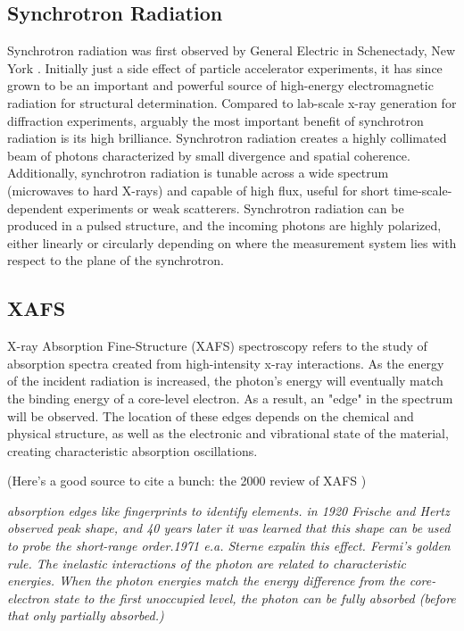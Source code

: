 \subsection{Synchrotron Radiation}

Synchrotron radiation was first observed by General Electric in Schenectady, New York \cite{firstSynchrotronRadPaper}. Initially just a side effect of particle accelerator experiments, it has since grown to be an important and powerful source of high-energy electromagnetic radiation for structural determination. Compared to lab-scale x-ray generation for diffraction experiments, arguably the most important benefit of synchrotron radiation is its high brilliance. Synchrotron radiation creates a highly collimated beam of photons characterized by small divergence and spatial coherence. Additionally, synchrotron radiation is tunable across a wide spectrum (microwaves to hard X-rays) and capable of high flux, useful for short time-scale-dependent experiments or weak scatterers. Synchrotron radiation can be produced in a pulsed structure, and the incoming photons are highly polarized, either linearly or circularly depending on where the measurement system lies with respect to the plane of the synchrotron. 

\subsection{XAFS}
X-ray Absorption Fine-Structure (XAFS) spectroscopy refers to the study of absorption spectra created from high-intensity x-ray interactions. As the energy of the incident radiation is increased, the photon's energy will eventually match the binding energy of a core-level electron. As a result, an "edge" in the spectrum will be observed. The location of these edges depends on the chemical and physical structure, as well as the electronic and vibrational state of the material, creating characteristic absorption oscillations.

(Here's a good source to cite a bunch: the 2000 review of XAFS
\cite{rehrXAFS2000review})
\cite{newville2014fundamentals}

\textit{absorption edges like fingerprints to identify elements. in 1920 Frische and Hertz observed peak shape, and 40 years later it was learned that this shape can be used to probe the short-range order.1971 e.a. Sterne expalin this effect. Fermi's golden rule. The inelastic interactions of the photon are related to characteristic energies. When the photon energies match the energy difference from the core-electron state to the first unoccupied level, the photon can be fully absorbed (before that only partially absorbed.)}



